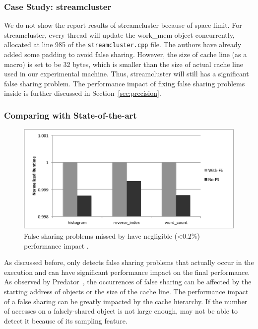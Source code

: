 \subsubsection{Case Study: streamcluster}

We do not show the report results of streamcluster because of space limit. For streamcluster, every thread will update the work\_mem object concurrently, allocated at line 985 of the \texttt{streamcluster.cpp} file. The authors have already added some padding to avoid false sharing. However, the size of cache line (as a macro) is set to be 32 bytes, which is smaller than the size of actual cache line used in our experimental machine. Thus, streamcluster will still has a significant false sharing problem. The performance impact of fixing false sharing problems inside is further discussed in Section~\ref{sec:precision}. 


\subsubsection{Comparing with State-of-the-art}

\begin{figure}[htbp]
\centering
\label{fig:fseffectiveness}
\includegraphics[width=.9\columnwidth]{figure/trivial.pdf}
\caption{False sharing problems missed by \cheetah{} have negligible (<0.2\%) performance impact .}
\end{figure}

As discussed before, \cheetah{} only detects false sharing problems that actually occur in the execution and can have significant performance impact on the final performance. As observed by Predator~\cite{Predator}, the occurrences of false sharing can be affected by the starting address of objects or the size of the cache line. The performance impact of a false sharing can be greatly impacted by the cache hierarchy. If the number of accesses on a falsely-shared object is not large enough, \cheetah{} may not be able to detect it because of its sampling feature. 

